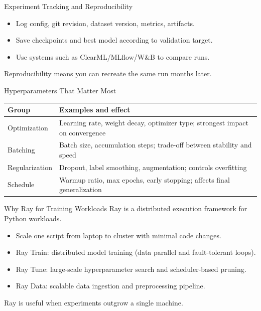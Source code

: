 \documentclass[aspectratio=169]{beamer}
\begin{document}
\begin{frame}[t]{Experiment Tracking and Reproducibility}
\begin{itemize}
    \item Log config, git revision, dataset version, metrics, artifacts.
    \item Save checkpoints and best model according to validation target.
    \item Use systems such as ClearML/MLflow/W\&B to compare runs.
\end{itemize}
\vspace{1mm}
Reproducibility means you can recreate the same run months later.
\end{frame}

\begin{frame}[t]{Hyperparameters That Matter Most}
\begin{tabular}{@{}p{3.2cm}p{8.0cm}@{}}
\toprule
Group & Examples and effect \\
\midrule
Optimization & Learning rate, weight decay, optimizer type; strongest impact on convergence \\
Batching & Batch size, accumulation steps; trade-off between stability and speed \\
Regularization & Dropout, label smoothing, augmentation; controls overfitting \\
Schedule & Warmup ratio, max epochs, early stopping; affects final generalization \\
\bottomrule
\end{tabular}
\end{frame}

\begin{frame}[t]{Why Ray for Training Workloads}
Ray is a distributed execution framework for Python workloads.
\vspace{1mm}
\begin{itemize}
    \item Scale one script from laptop to cluster with minimal code changes.
    \item Ray Train: distributed model training (data parallel and fault-tolerant loops).
    \item Ray Tune: large-scale hyperparameter search and scheduler-based pruning.
    \item Ray Data: scalable data ingestion and preprocessing pipeline.
\end{itemize}
\vspace{1mm}
Ray is useful when experiments outgrow a single machine.
\end{frame}
\end{document}
